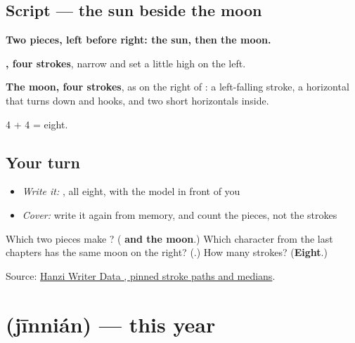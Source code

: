 \subsection*{Script — the sun beside the moon}

\begin{quote}
\end{quote}

\textbf{Two pieces, left before right: the sun, then the moon.}

\textbf{, four strokes}, narrow and set a little high on the left.

\textbf{The moon, four strokes}, as on the right of : a left-falling stroke, a horizontal that turns down and hooks, and two short horizontals inside.

4 + 4 = eight.

\subsection*{Your turn}
\begin{itemize}
\raggedright
  \item \emph{Write it:} , all eight, with the model in front of you
  \item \emph{Cover:} write it again from memory, and count the pieces, not the strokes
\end{itemize}

\begin{tcolorbox}[breakable,colback=teal!4,colframe=teal!35!black,title={Before you move on}]
Which two pieces make ? (\textbf{ and the moon}.) Which character from the last chapters has the same moon on the right? (\textbf{}.) How many strokes? (\textbf{Eight}.)

Source: \href{https://raw.githubusercontent.com/chanind/hanzi-writer-data/68d10a4b21150cae5e1ebbd223eed289cf32d90c/data/\%E6\%98\%8E.json}{Hanzi Writer Data , pinned stroke paths and medians}.
\end{tcolorbox}
\section[\texorpdfstring{\zh{今年} (jīnnián)}{今年 (jīnnián)}]{ (jīnnián) — this year}

\label{lesson:ZH-C47-jinnian}



